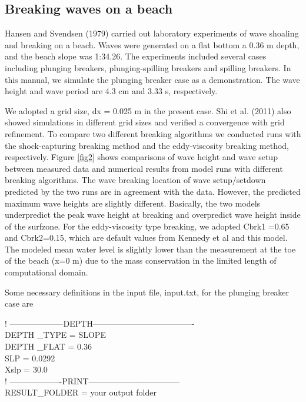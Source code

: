 \documentclass[11pt]{article}
\begin{document}
\subsection{Breaking waves on a beach }

Hansen and Svendsen (1979) carried out laboratory experiments of wave shoaling and breaking on a beach.  Waves were generated on a flat bottom a 0.36 m depth, and the  beach slope was 1:34.26.  The experiments included several cases including plunging breakers, plunging-spilling breakers and spilling breakers.  In this manual, we simulate  the plunging breaker case as a demonstration. The wave height and wave period are  4.3 cm and 3.33 s, respectively. 

 We  adopted a grid size, dx = 0.025 m in the present case. Shi et al. (2011) also showed simulations in different grid sizes and verified a convergence with grid refinement. To compare two different breaking algorithms we conducted runs with the shock-capturing breaking method and the eddy-viscosity breaking method, respectively. Figure \ref{fig2} shows comparisons of wave height and wave setup between measured data and numerical results from model runs with different breaking algorithms. The wave breaking location of wave setup/setdown predicted by the two runs are in agreement with the data. 
  However,  
the predicted maximum wave heights are slightly different.  Basically, the two models underpredict the peak wave height at breaking and overpredict wave height inside of the surfzone.  For the eddy-viscosity type breaking, we adopted Cbrk1 =0.65 and Cbrk2=0.15, which are default values from Kennedy et al and this model. The modeled mean water level is slightly lower than the measurement at the toe of the beach (x=0 m)  due to the mass conservation in the limited length of computational domain. 

Some necessary definitions  in the input file, input.txt, for the plunging breaker case are

\vspace*{0.5cm}
  ! --------------------DEPTH-------------------------------------\\
DEPTH \_TYPE = SLOPE\\
DEPTH \_FLAT = 0.36  \\
SLP = 0.0292\\
Xslp = 30.0\\

  ! -------------------PRINT--------------------------------- \\
RESULT\_FOLDER = your output folder \\
\end{document}
